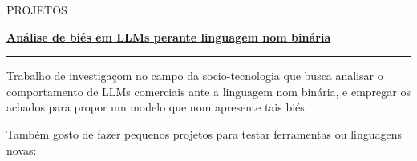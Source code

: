 \documentclass [10pt, a4paper] {extarticle}
\newcommand{\sectionlinethickness} {0.5 pt }
\newcommand{\leftcolumwidth} {0.15 }
\newcommand{\rightcolumwidth}{ 0.84 }
\newcommand {\sectiontitle}[1] {
  \vspace*{-10px}
  \begin {flushleft}
  \begin {minipage}[c]{\leftcolumwidth\textwidth}
    \begin {flushright}
      \!\MakeUppercase {#1}
      \hspace* {10px}
    \end {flushright}
  \end {minipage}
  \begin{minipage}[c]{\rightcolumwidth\textwidth}
    \begin {tikzpicture}[remember picture, overlay,blend mode=multiply]
      \draw [line width=\sectionlinethickness, namelines] (0,0) -- (15,0);
    \end {tikzpicture}
  \end{minipage}
  \end {flushleft}
}
\begin{document}

  \sectiontitle {projetos}
  \vspace{-15px}

  \begin {flushright}
  \begin {minipage} [t] {\rightcolumwidth\textwidth}

    \begin{minipage}[c]{400pt}
      \href {https://github.com/yref-boop/ai-bias} {\textbf {Análise de biés em LLMs perante linguagem nom binária}}
    \end{minipage}
    \hfill
    \begin{minipage}[c]{8pt}
    \end{minipage}
    \vspace{1px}
    \hrule
    \vspace {4px} Trabalho de investigaçom no campo da socio-tecnologia que busca analisar o comportamento de LLMs comerciais ante a linguagem nom binária, e empregar os achados para propor um modelo que nom apresente tais biés.
    \vspace{5px}

    Também gosto de fazer pequenos projetos para testar ferramentas ou linguagens novas:
    \vspace{5px}


\end{minipage}
\end{flushright}
\end{document}
